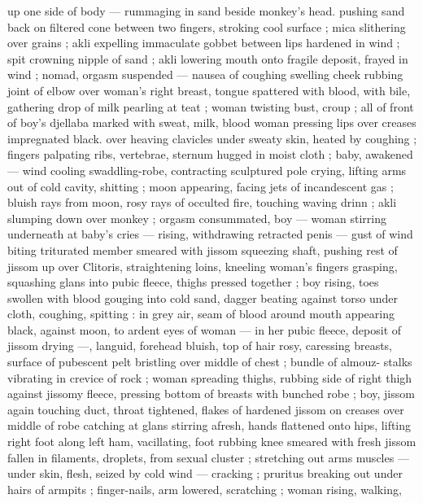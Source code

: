 up one side of body --- rummaging in sand beside monkey's head. 
pushing sand back on filtered cone between two fingers, stroking 
cool surface ; mica slithering over grains ; akli expelling immaculate 
gobbet between lips hardened in wind ; spit crowning nipple of sand 
; akli lowering mouth onto fragile deposit, frayed in wind ; nomad, 
orgasm suspended --- nausea of coughing swelling cheek {\dashcom}
rubbing joint of elbow over woman's right breast, tongue spattered 
with blood, with bile, gathering drop of milk pearling at teat ; woman 
twisting bust, croup ; all of front of boy's djellaba marked with sweat, 
milk, blood {\col} woman pressing lips over creases impregnated black. 
over heaving clavicles under sweaty skin, heated by coughing ; 
fingers palpating ribs, vertebrae, sternum hugged in moist cloth ; 
baby, awakened --- wind cooling swaddling-robe, contracting 
sculptured pole {\dashcom} crying, lifting arms out of cold cavity, shitting ; 
moon appearing, facing jets of incandescent gas ; bluish rays from 
moon, rosy rays of occulted fire, touching waving drinn ; akli 
slumping down over monkey ; orgasm consummated, boy --- woman 
stirring underneath at baby's cries --- rising, withdrawing retracted 
penis --- gust of wind biting triturated member smeared with jissom 
{\dashcom} squeezing shaft, pushing rest of jissom up over Clitoris, 
straightening loins, kneeling woman's fingers grasping, squashing 
glans into pubic fleece, thighs pressed together ; boy rising, toes 
swollen with blood gouging into cold sand, dagger beating against 
torso under cloth, coughing, spitting : in grey air, seam of blood 
around mouth appearing black, against moon, to ardent eyes of 
woman --- in her pubic fleece, deposit of jissom drying ---, languid, 
forehead bluish, top of hair rosy, caressing breasts, surface of 
pubescent pelt bristling over middle of chest ; bundle of almouz- 
stalks vibrating in crevice of rock ; woman spreading thighs, rubbing 
side of right thigh against jissomy fleece, pressing bottom of breasts 
with bunched robe ; boy, jissom again touching duct, throat 
tightened, flakes of hardened jissom on creases over middle of robe 
catching at glans stirring afresh, hands flattened onto hips, lifting 
right foot along left ham, vacillating, foot rubbing knee smeared with 
fresh jissom fallen in filaments, droplets, from sexual cluster ; 
stretching out arms {\col} muscles --- under skin, flesh, seized by cold 
wind --- cracking ; pruritus breaking out under hairs of armpits ; 
finger-nails, arm lowered, scratching ; woman rising, walking, 
